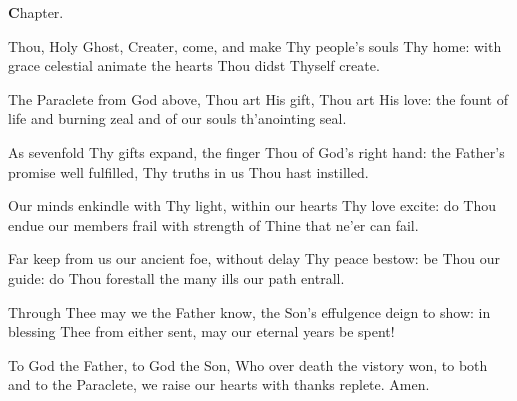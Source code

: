 \documentclass[letterpaper,12pt]{article} %
\begin{document}
\normalsize
\begin{center}{\large\textbf Chapter.}\end{center}
\begin{parcolumns}[rulebetween]{2}
\end{parcolumns}
\medskip

\large
\normalsize
{}
\begin{multicols}{2}
\begin{psalmverses}
{\item Thou, Holy Ghost, Creater, come,
and make Thy people's souls Thy home:
with grace celestial animate
the hearts Thou didst Thyself create.

\item The Paraclete from God above,
Thou art His gift, Thou art His love:
the fount of life and burning zeal
and of our souls th'anointing seal.

\item As sevenfold Thy gifts expand,
the finger Thou of God's right hand:
the Father's promise well fulfilled,
Thy truths in us Thou hast instilled.

\item Our minds enkindle with Thy light,
within our hearts Thy love excite:
do Thou endue our members frail
with strength of Thine that ne'er can fail.

\item Far keep from us our ancient foe,
without delay Thy peace bestow:
be Thou our guide: do Thou forestall
the many ills our path entrall.

\item Through Thee may we the Father know,
the Son's effulgence deign to show:
in blessing Thee from either sent,
may our eternal years be spent!

\item To God the Father, to God the Son,
Who over death the vistory won,
to both and to the Paraclete,
we raise our hearts with thanks replete.
Amen.
}
\end{psalmverses}
\end{multicols}
\end{document}

